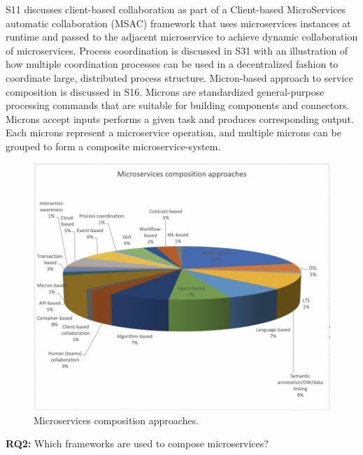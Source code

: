 \documentclass{article}
\begin{document}
\begin{multicols}{2}
S11 discusses client-based collaboration as part of a Client-based MicroServices automatic collaboration (MSAC) framework that uses microservices instances at runtime and passed to the adjacent microservice to achieve dynamic collaboration of microservices. Process coordination is discussed in S31 with an illustration of how multiple coordination processes can be used in a decentralized fashion to coordinate large, distributed process structure. Micron-based approach to service composition is discussed in S16. Microns are standardized general-purpose processing commands that are suitable for building components and connectors. Microns accept inputs performs a given task and produces corresponding output. Each microns represent a microservice operation, and multiple microns can be grouped to form a composite microservice-system. 

\begin{figure}[htbp]
 \centerline{\includegraphics[scale=0.60]{mscomappr.png}}
  \caption{Microservices composition approaches.}
  \label{fig}
\end{figure}

\textbf{RQ2:} Which frameworks are used to compose microservices?


\end{multicols}
\end{document}
